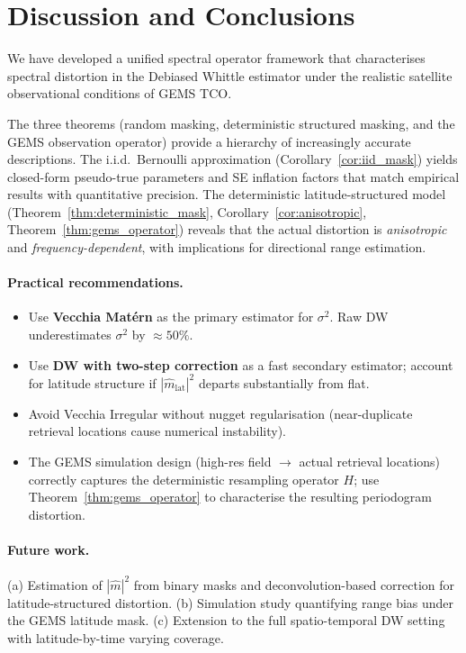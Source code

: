 \documentclass[12pt]{article}
\begin{document}
\section{Discussion and Conclusions}
\label{sec:discussion}

We have developed a unified spectral operator framework that characterises
spectral distortion in the Debiased Whittle estimator under the realistic
satellite observational conditions of GEMS TCO.

The three theorems (random masking, deterministic structured masking,
and the GEMS observation operator) provide a hierarchy of increasingly
accurate descriptions.
The i.i.d.\ Bernoulli approximation (Corollary~\ref{cor:iid_mask})
yields closed-form pseudo-true parameters and SE inflation factors that
match empirical results with quantitative precision.
The deterministic latitude-structured model
(Theorem~\ref{thm:deterministic_mask}, Corollary~\ref{cor:anisotropic},
Theorem~\ref{thm:gems_operator}) reveals that the actual distortion is
\emph{anisotropic} and \emph{frequency-dependent}, with implications for
directional range estimation.

\paragraph{Practical recommendations.}
\begin{itemize}
  \item Use \textbf{Vecchia Matérn} as the primary estimator for $\sigma^2$.
        Raw DW underestimates $\sigma^2$ by $\approx 50\%$.
  \item Use \textbf{DW with two-step correction} as a fast secondary
        estimator; account for latitude structure if
        $|\hat{m}_{\mathrm{lat}}|^2$ departs substantially from flat.
  \item Avoid Vecchia Irregular without nugget regularisation
        (near-duplicate retrieval locations cause numerical instability).
  \item The GEMS simulation design (high-res field $\to$ actual retrieval
        locations) correctly captures the deterministic resampling
        operator $H$; use Theorem~\ref{thm:gems_operator} to characterise
        the resulting periodogram distortion.
\end{itemize}

\paragraph{Future work.}
(a) Estimation of $|\hat{m}|^2$ from binary masks and
    deconvolution-based correction for latitude-structured distortion.
(b) Simulation study quantifying range bias under the GEMS latitude mask.
(c) Extension to the full spatio-temporal DW setting with
    latitude-by-time varying coverage.
\end{document}
